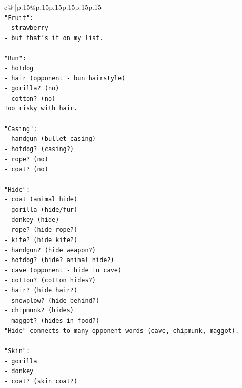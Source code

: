 \documentclass{article}
\begin{document}
{\begin{supertabular}{c@{$\;$}|p{.15\linewidth}@{}p{.15\linewidth}p{.15\linewidth}p{.15\linewidth}p{.15\linewidth}p{.15\linewidth}}
{{{\\ 
\texttt{"Fruit":} \\
\texttt{{-} strawberry} \\
\texttt{{-} but that's it on my list.} \\
\\ 
\texttt{"Bun":} \\
\texttt{{-} hotdog} \\
\texttt{{-} hair (opponent {-} bun hairstyle)} \\
\texttt{{-} gorilla? (no)} \\
\texttt{{-} cotton? (no)} \\
\texttt{Too risky with hair.} \\
\\ 
\texttt{"Casing":} \\
\texttt{{-} handgun (bullet casing)} \\
\texttt{{-} hotdog? (casing?)} \\
\texttt{{-} rope? (no)} \\
\texttt{{-} coat? (no)} \\
\\ 
\texttt{"Hide":} \\
\texttt{{-} coat (animal hide)} \\
\texttt{{-} gorilla (hide/fur)} \\
\texttt{{-} donkey (hide)} \\
\texttt{{-} rope? (hide rope?)} \\
\texttt{{-} kite? (hide kite?)} \\
\texttt{{-} handgun? (hide weapon?)} \\
\texttt{{-} hotdog? (hide? animal hide?)} \\
\texttt{{-} cave (opponent {-} hide in cave)} \\
\texttt{{-} cotton? (cotton hides?)} \\
\texttt{{-} hair? (hide hair?)} \\
\texttt{{-} snowplow? (hide behind?)} \\
\texttt{{-} chipmunk? (hides)} \\
\texttt{{-} maggot? (hides in food?)} \\
\texttt{"Hide" connects to many opponent words (cave, chipmunk, maggot).} \\
\\ 
\texttt{"Skin":} \\
\texttt{{-} gorilla} \\
\texttt{{-} donkey  } \\
\texttt{{-} coat? (skin coat?)} \\
}}}
\end{supertabular}}
\end{document}
